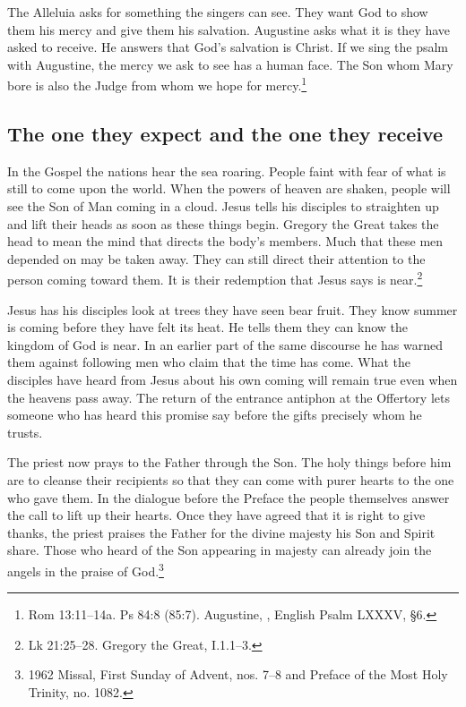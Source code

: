 The Alleluia asks for something the singers can see. They want God to show them his mercy and give them his salvation. Augustine asks what it is they have asked to receive. He answers that God's salvation is Christ. If we sing the psalm with Augustine, the mercy we ask to see has a human face. The Son whom Mary bore is also the Judge from whom we hope for mercy.\footnote{Rom 13:11--14a. Ps 84:8 (85:7). Augustine, , English Psalm LXXXV, §6.}

\clearpage
\subsection{The one they expect and the one they receive}

In the Gospel the nations hear the sea roaring. People faint with fear of what is still to come upon the world. When the powers of heaven are shaken, people will see the Son of Man coming in a cloud. Jesus tells his disciples to straighten up and lift their heads as soon as these things begin. Gregory the Great takes the head to mean the mind that directs the body's members. Much that these men depended on may be taken away. They can still direct their attention to the person coming toward them. It is their redemption that Jesus says is near.\footnote{Lk 21:25--28. Gregory the Great,  I.1.1--3.}

Jesus has his disciples look at trees they have seen bear fruit. They know summer is coming before they have felt its heat. He tells them they can know the kingdom of God is near. In an earlier part of the same discourse he has warned them against following men who claim that the time has come. What the disciples have heard from Jesus about his own coming will remain true even when the heavens pass away. The return of the entrance antiphon at the Offertory lets someone who has heard this promise say before the gifts precisely whom he trusts.

The priest now prays to the Father through the Son. The holy things before him are to cleanse their recipients so that they can come with purer hearts to the one who gave them. In the dialogue before the Preface the people themselves answer the call to lift up their hearts. Once they have agreed that it is right to give thanks, the priest praises the Father for the divine majesty his Son and Spirit share. Those who heard of the Son appearing in majesty can already join the angels in the praise of God.\footnote{1962 Missal, First Sunday of Advent, nos. 7--8 and Preface of the Most Holy Trinity, no. 1082.}

